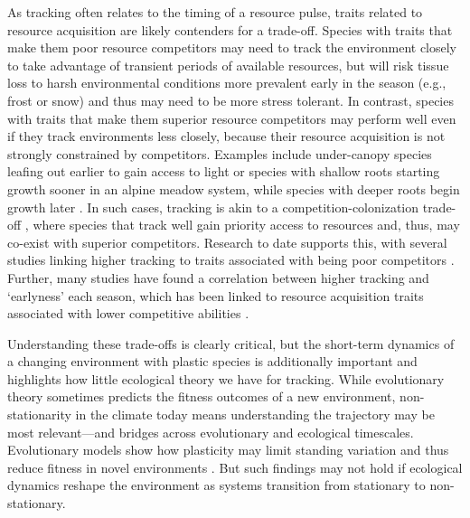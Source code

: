 \documentclass[11pt,letterpaper]{article}
\newcommand{\R}[1]{\label{#1}\linelabel{#1}}
\begin{document}
As tracking often relates to the timing of a resource pulse, traits related to resource acquisition are likely contenders for a trade-off. Species with traits that make them poor resource competitors may need to track the environment closely to take advantage of transient periods of available resources, but will risk tissue loss to harsh environmental conditions more prevalent early in the season (e.g., frost or snow) and thus may need to be more stress tolerant.\R{r1stress} In contrast, species with traits that make them superior resource competitors may perform well even if they track environments less closely, because their resource acquisition is not strongly constrained by competitors. Examples include under-canopy species leafing out earlier to gain access to light \citep{heberling2019} or species with shallow roots starting growth sooner in an alpine meadow system, while species with deeper roots begin growth later \citep{Zhu2016BioLetters}. In such cases, tracking is akin to a competition-colonization trade-off \citep{Amarasekare:2003tq}, where species that track well gain priority access to resources and, thus, may co-exist with superior competitors. Research to date supports this, with several studies linking higher tracking to traits associated with being poor competitors \citep{Dorji2013,lasky2016,Zhu2016BioLetters}. Further, many studies have found a correlation between higher tracking and `earlyness' each season, which has been linked to resource acquisition traits associated with lower competitive abilities \citep[][see Box `Trait trade-offs with tracking']{wolkovich2014aob}.  

Understanding these trade-offs is clearly critical, but the short-term dynamics of a changing environment with plastic species is additionally important and highlights how little ecological theory we have for tracking. While evolutionary theory sometimes predicts the fitness outcomes of a new environment, non-stationarity in the climate today means understanding the trajectory may be most relevant---and bridges across evolutionary and ecological timescales. Evolutionary models show how plasticity may limit standing variation and thus reduce fitness in novel environments \citep{Ghalambor2007,fournier2016,fox2019}. But such findings may not hold if ecological dynamics reshape the environment as systems transition from stationary to non-stationary. 
\end{document}
